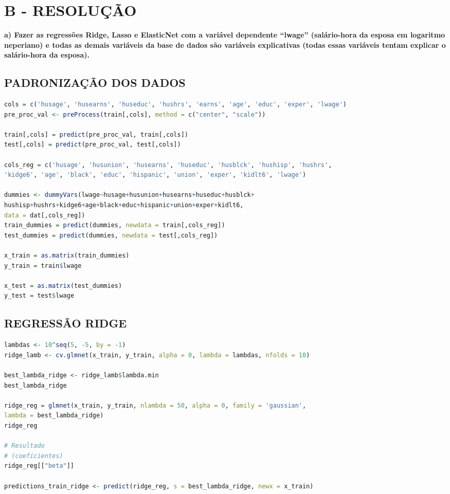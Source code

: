 \section*{\textbf{B - RESOLUÇÃO}}
\begin{adjustwidth}{1em}{}
\textbf{a) Fazer as regressões Ridge, Lasso e ElasticNet com a variável dependente “lwage” (salário-hora da
esposa em logaritmo neperiano) e todas as demais variáveis da base de dados são variáveis explicativas (todas essas
variáveis tentam explicar o salário-hora da esposa).}
\end{adjustwidth}

\subsection*{PADRONIZAÇÃO DOS DADOS}

\begin{lstlisting}[language=R, style=input]
cols = c('husage', 'husearns', 'huseduc', 'hushrs', 'earns', 'age', 'educ', 'exper', 'lwage')
pre_proc_val <- preProcess(train[,cols], method = c("center", "scale"))

train[,cols] = predict(pre_proc_val, train[,cols])
test[,cols] = predict(pre_proc_val, test[,cols])

cols_reg = c('husage', 'husunion', 'husearns', 'huseduc', 'husblck', 'hushisp', 'hushrs',
'kidge6', 'age', 'black', 'educ', 'hispanic', 'union', 'exper', 'kidlt6', 'lwage')

dummies <- dummyVars(lwage~husage+husunion+husearns+huseduc+husblck+
hushisp+hushrs+kidge6+age+black+educ+hispanic+union+exper+kidlt6, 
data = dat[,cols_reg])
train_dummies = predict(dummies, newdata = train[,cols_reg])
test_dummies = predict(dummies, newdata = test[,cols_reg])

x_train = as.matrix(train_dummies)
y_train = train$lwage

x_test = as.matrix(test_dummies)
y_test = test$lwage
\end{lstlisting}

\subsection*{REGRESSÃO RIDGE}
\begin{lstlisting}[language=R, style=input]
lambdas <- 10^seq(5, -5, by = -1)
ridge_lamb <- cv.glmnet(x_train, y_train, alpha = 0, lambda = lambdas, nfolds = 10)

best_lambda_ridge <- ridge_lamb$lambda.min
best_lambda_ridge

ridge_reg = glmnet(x_train, y_train, nlambda = 50, alpha = 0, family = 'gaussian', 
lambda = best_lambda_ridge)
ridge_reg

# Resultado
# (coeficientes)
ridge_reg[["beta"]]

predictions_train_ridge <- predict(ridge_reg, s = best_lambda_ridge, newx = x_train)
\end{lstlisting}

